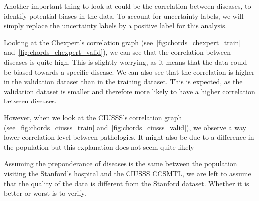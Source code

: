 \documentclass[11pt]{article}
\begin{document}
    Another important thing to look at could be the correlation between diseases, to identify potential biases in the
    data. To account for uncertainty labels, we will simply replace the uncertainty labels by a positive label for
    this analysis.

    Looking at the Chexpert's correlation graph (see~\ref{fig:chords_chexpert_train} and~\ref{fig:chords_chexpert_valid}),
    we can see that the correlation between diseases is quite high. This is slightly worrying, as it means that the data could be biased
    towards a specific disease. We can also see that the correlation is higher in the validation dataset than in the training
    dataset. This is expected, as the validation dataset is smaller and therefore more likely to have a higher correlation
    between diseases.


    However, when we look at the CIUSSS's correlation graph (see~\ref{fig:chords_ciusss_train} and~\ref{fig:chords_ciusss_valid}), we observe a way lower correlation level between pathologies.
    It might also be due to a difference in the population but this explanation does not seem quite likely

    Assuming the preponderance of diseases is the same between the population visiting the Stanford's hospital and
    the CIUSSS CCSMTL, we are left to assume that the quality of the data is different from the Stanford dataset. Whether it is better or worst is to verify.
\end{document}
